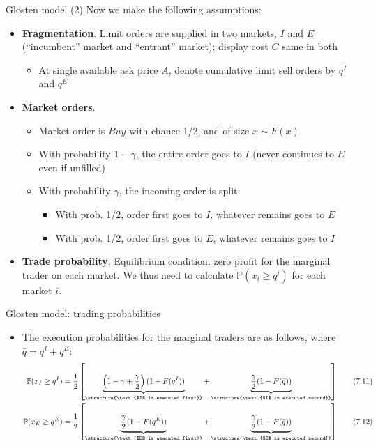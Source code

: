 \documentclass[english,10pt
,aspectratio=169
]{beamer}
\begin{document}
\begin{frame}{Glosten model (2)}
	Now we make the following assumptions:
	\begin{itemize}
		\item \textbf{Fragmentation}. Limit orders are supplied in two markets, $I$ and $E$ (``incumbent'' market and ``entrant'' market); display cost $C$ same in both
		\begin{itemize}
			\item At single available ask price $A$, denote cumulative limit sell orders by $q^I$ and $q^E$
		\end{itemize}
		\item \textbf{Market orders}. 
		\begin{itemize}
			\item Market order is $Buy$ with chance 1/2, and of size $x \sim F(x)$
			\item With probability $1-\gamma$, the entire order goes to $I$ (never continues to $E$ even if unfilled)
			\item With probability $\gamma$, the incoming order is split:
			\begin{itemize}
				\item With prob. 1/2, order first goes to $I$, whatever remains goes to $E$
				\item With prob. 1/2, order first goes to $E$, whatever remains goes to $I$
			\end{itemize}
		\end{itemize}
		\item  \textbf{Trade probability}. Equilibrium condition: zero profit for the marginal trader on each market. We thus need to calculate $\mathbb{P}(x_i \geq q^i)$ for each market $i$.
	\end{itemize}
\end{frame}


\begin{frame}{Glosten model: trading probabilities}
	\begin{itemize}
		\item The execution probabilities for the marginal traders are as follows, where $\bar{q}=q^I+q^E$:
		\begin{align}
		\mathbb{P}(x_I \geq q^I) & = \frac{1}{2} \left[\underbrace{\left(1-\gamma+\frac{\gamma}{2} \right) (1-F(q^I))}_{\structure{\text{$I$ is executed first}}} + \underbrace{\frac{\gamma}{2}(1-F(\bar{q}))}_{\structure{\text{$I$ is executed second}}}\right] \tag{7.11} \\
		\mathbb{P}(x_E \geq q^E) & = \frac{1}{2} \left[\underbrace{\frac{\gamma}{2} (1-F(q^E))}_{\structure{\text{$E$ is executed first}}} + \underbrace{\frac{\gamma}{2}(1-F(\bar{q}))}_{\structure{\text{$E$ is executed second}}}\right] \tag{7.12}
		\end{align}
	\end{itemize}
\end{frame}
\end{document}
